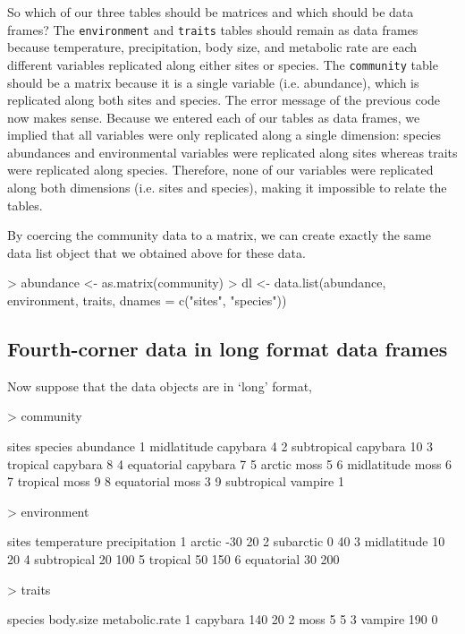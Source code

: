 \documentclass{article}
\newcommand{\code}[1]{\texttt{#1}}
\numberwithin{exercise}{section}
\begin{document}
So which of our three tables should be matrices and which should be data frames?  The \code{environment} and \code{traits} tables should remain as data frames because temperature, precipitation, body size, and metabolic rate are each different variables replicated along either sites or species.  The \code{community} table should be a matrix because it is a single variable (i.e. abundance), which is replicated along both sites and species.  The error message of the previous code now makes sense.  Because we entered each of our tables as data frames, we implied that all variables were only replicated along a single dimension:  species abundances and environmental variables were replicated along sites whereas traits were replicated along species.  Therefore, none of our variables were replicated along both dimensions (i.e. sites and species), making it impossible to relate the tables.

By coercing the community data to a matrix, we can create exactly the same data list object that we obtained above for these data.
\begin{Schunk}
\begin{Sinput}
> abundance <- as.matrix(community)
> dl <- data.list(abundance, environment, traits, dnames = c("sites", "species"))
\end{Sinput}
\end{Schunk}

\subsection{Fourth-corner data in long format data frames}

Now suppose that the data objects are in `long' format,


\begin{Schunk}
\begin{Sinput}
> community
\end{Sinput}
\begin{Soutput}
        sites  species abundance
1 midlatitude capybara         4
2 subtropical capybara        10
3    tropical capybara         8
4  equatorial capybara         7
5      arctic     moss         5
6 midlatitude     moss         6
7    tropical     moss         9
8  equatorial     moss         3
9 subtropical  vampire         1
\end{Soutput}
\begin{Sinput}
> environment
\end{Sinput}
\begin{Soutput}
        sites temperature precipitation
1      arctic         -30            20
2   subarctic           0            40
3 midlatitude          10            20
4 subtropical          20           100
5    tropical          50           150
6  equatorial          30           200
\end{Soutput}
\begin{Sinput}
> traits
\end{Sinput}
\begin{Soutput}
   species body.size metabolic.rate
1 capybara       140             20
2     moss         5              5
3  vampire       190              0
\end{Soutput}
\end{Schunk}
\end{document}
